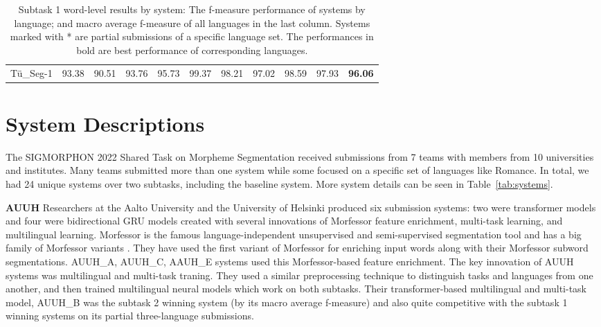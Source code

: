 \documentclass[11pt]{article}
\begin{document}
\begin{table*}[t]
\begin{tabularx}{\textwidth}{l|RRRRRRRRR|R}
\hline
\hline
Tü\_Seg-1    & 93.38          & 90.51          & 93.76          & 95.73          & 99.37          & 98.21          & 97.02          & 98.59          & 97.93          & \textbf{96.06}
\end{tabularx}
\caption{\label{tab:subtask1:all}Subtask 1 word-level results by system: The f-measure performance of systems by language; and macro average f-measure of all languages in the last column. Systems marked with * are partial submissions of a specific language set. The performances in bold are best performance of corresponding languages.}
\end{table*}


\section{System Descriptions}
The SIGMORPHON 2022 Shared Task on Morpheme Segmentation received submissions from 7 teams with members from 10 universities and institutes. Many teams submitted more than one system while some focused on a specific set of languages like Romance. In total, we had 24 unique systems over two subtasks, including the baseline system. More system details can be seen in Table~\ref{tab:systems}.

\vspace{1em} \noindent \textbf{AUUH} Researchers at the Aalto University and the University of Helsinki produced six submission systems: two were transformer models and four were bidirectional GRU models created with several innovations of Morfessor feature enrichment, multi-task learning, and multilingual learning. Morfessor \cite{creutz2002unsupervised,creutz2007unsupervised} is the famous language-independent unsupervised and semi-supervised segmentation tool and has a big family of Morfessor variants \cite{virpioja2013morfessor,gronroos2014morfessor,ataman2017linguistically,gronroos2020morfessor}. They have used the first variant of Morfessor \cite{creutz2005unsupervised} for enriching input words along with their Morfessor subword segmentations. AUUH\_A, AUUH\_C, AAUH\_E systems used this Morfessor-based feature enrichment. The key innovation of AUUH systems was multilingual and multi-task traning. They used a similar preprocessing technique \cite{johnson2017google} to distinguish tasks and languages from one another, and then trained multilingual neural models which work on both subtasks. Their transformer-based multilingual and multi-task model, AUUH\_B was the subtask 2 winning system (by its macro average f-measure) and also quite competitive with the subtask 1 winning systems on its partial three-language submissions. 
\end{document}
